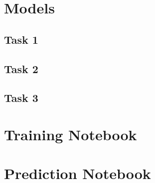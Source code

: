 \section{Models}
\subsection{Task 1}

\subsection{Task 2}

\subsection{Task 3}
\section{Training Notebook}

\section{Prediction Notebook}

